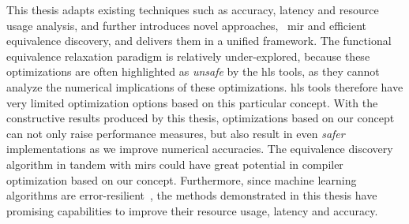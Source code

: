 This thesis adapts existing techniques such as accuracy, latency and resource
usage analysis, and further introduces novel approaches, \eg~\gls{mir} and
efficient equivalence discovery, and delivers them in a unified framework.
The functional equivalence relaxation paradigm is relatively under-explored,
because these optimizations are often highlighted as \emph{unsafe} by the
\gls{hls} tools, as they cannot analyze the numerical implications of these
optimizations.  \Gls{hls} tools therefore have very limited optimization
options based on this particular concept.  With the constructive results
produced by this thesis, optimizations based on our concept can not only raise
performance measures, but also result in even \emph{safer} implementations
as we improve numerical accuracies.  The equivalence discovery algorithm in
tandem with \glspl{mir} could have great potential in compiler optimization
based on our concept.  Furthermore, since machine learning algorithms are
error-resilient~\cite{lesser11, kim09, holt91, zhu03}, the methods demonstrated
in this thesis have promising capabilities to improve their resource usage,
latency and accuracy.
